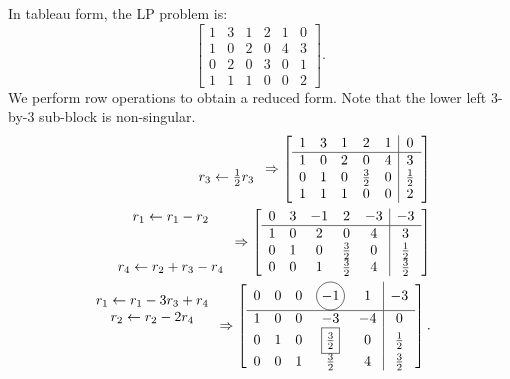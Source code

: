 \begin{example}
In tableau form, the LP problem is:
\[
\left[\begin{array}{ccccc|c} 1 & 3 & 1 & 2 & 1 & 0\\\hline 1 & 0 & 2 & 0 & 4 & 3\\ 0 & 2 & 0 & 3 & 0 & 1\\ 1 & 1 & 1 & 0 & 0 & 2\end{array}\right].
\]
We perform row operations to obtain a reduced form. Note that the lower left $3$-by-$3$ sub-block is non-singular.
\begin{align*}
\begin{array}{c} ~\\r_3 \leftarrow \tfrac{1}{2}r_3\end{array} \Rightarrow \left[\begin{array}{ccccc|c} 1 & 3 & 1 & 2 & 1 & 0\\\hline 1 & 0 & 2 & 0 & 4 & 3\\ 0 & 1 & 0 & \tfrac{3}{2} & 0 & \tfrac{1}{2}\\ 1 & 1 & 1 & 0 & 0 & 2\end{array}\right]\\
\begin{array}{c} r_1 \leftarrow r_1-r_2\\~\\~\\r_4\leftarrow r_2+r_3-r_4\end{array} \Rightarrow \left[\begin{array}{ccccc|c} 0 & 3 & -1 & 2 & -3 & -3\\\hline 1 & 0 & 2 & 0 & 4 & 3\\ 0 & 1 & 0 & \tfrac{3}{2} & 0 & \tfrac{1}{2}\\ 0 & 0 & 1 & \tfrac{3}{2} & 4 & \tfrac{3}{2}\end{array}\right]\\
\begin{array}{c} r_1 \leftarrow r_1-3r_3+r_4\\r_2\leftarrow r_2-2r_4\\~\\~\end{array} \Rightarrow \left[\begin{array}{ccccc|c} 0 & 0 & 0 & \circled{$-{\rm 1}$} & 1 & -3\\\hline 1 & 0 & 0 & -3 & -4 & 0\\ 0 & 1 & 0 & \fbox{$\tfrac{3}{2}$} & 0 & \tfrac{1}{2}\\ 0 & 0 & 1 & \tfrac{3}{2} & 4 & \tfrac{3}{2}\end{array}\right].

\end{align*}
\end{example}
